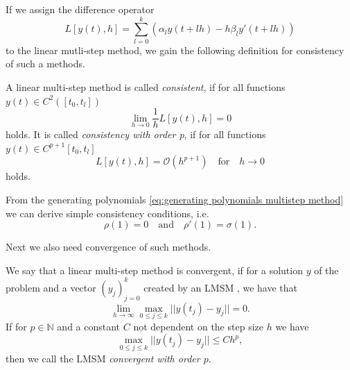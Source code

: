 	If we assign the difference operator
	\begin{equation}
		L[y(t),h] = \sum_{l=0}^{k} \left( \alpha_l y(t+lh) - h \beta_l y'(t+lh) \right)
	\end{equation}
	to the linear mutli-step method, we gain the following definition for consistency of such a methods.
	
	\newpage
	
	\begin{definition}
		A linear multi-step method is called %
		\emph{consistent}, if for all functions $y(t) \in C^2([t_0,t_l])$
		\begin{displaymath}
			\lim\limits_{h \to 0} \frac{1}{h} L[y(t),h] = 0
		\end{displaymath}
		holds. It is called \emph{consistency with order p}, if for all functions $y(t) \in C^{p+1}[t_0, t_l]$
		\begin{displaymath}
			L[y(t),h] = \mathcal{O}(h^{p+1}) \quad \text{for} \quad h \to 0
		\end{displaymath}
		holds.
	\end{definition}

	From the generating polynomials \eqref{eq:generating polynomials multistep method} we can derive simple consistency conditions, i.e.
	\begin{displaymath}
		\rho(1) = 0 \quad \text{and} \quad \rho'(1) = \sigma(1).
	\end{displaymath}

	Next we also need convergence of such methods.
	
	\begin{definition} \label{def: LMSM convergence}
		We say that a linear multi-step method is convergent, if for a solution $y$ of the problem and a vector $(y_j)_{j=0}^k$ created by an LMSM , we have that
		\begin{displaymath}
			\lim\limits_{h \to \infty} \max_{0 \leq j \leq k} ||y(t_j) - y_j|| = 0.
		\end{displaymath}
		If for $p \in \mathbb{N}$ and a constant $C$ not dependent on the step size $h$ we have
		\begin{displaymath}
			\max_{0 \leq j \leq k} ||y(t_j) - y_j|| \leq Ch^p,
		\end{displaymath}
		then we call the LMSM \emph{convergent with order $p$}.
	\end{definition}
	
